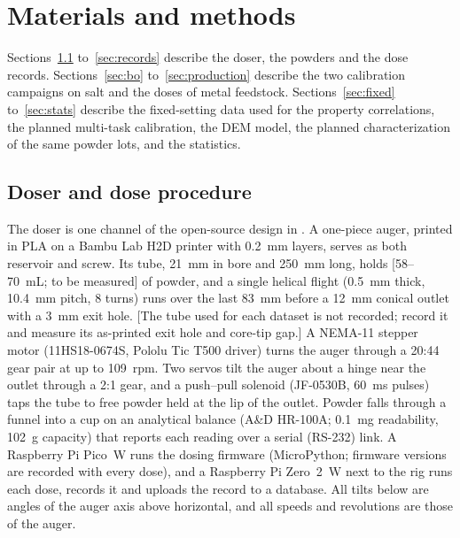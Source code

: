 \documentclass[preprint,12pt]{elsarticle}
\newcommand{\ph}[1]{\textcolor{orange!75!black}{\textsf{[#1]}}}
\begin{document}
\section{Materials and methods}
\label{sec:methods}

Sections~\ref{sec:doser} to~\ref{sec:records} describe the doser, the powders and the dose records. Sections~\ref{sec:bo} to~\ref{sec:production} describe the two calibration campaigns on salt and the doses of metal feedstock. Sections~\ref{sec:fixed} to~\ref{sec:stats} describe the fixed-setting data used for the property correlations, the planned multi-task calibration, the DEM model, the planned characterization of the same powder lots, and the statistics.

\subsection{Doser and dose procedure}
\label{sec:doser}

The doser is one channel of the open-source design in \cite{Charles2026Open,PowderDoserRepo}. A one-piece auger, printed in PLA on a Bambu Lab H2D printer with 0.2~mm layers, serves as both reservoir and screw. Its tube, 21~mm in bore and 250~mm long, holds \ph{58--70~mL; to be measured} of powder, and a single helical flight (0.5~mm thick, 10.4~mm pitch, 8 turns) runs over the last 83~mm before a 12~mm conical outlet with a 3~mm exit hole. \ph{The tube used for each dataset is not recorded; record it and measure its as-printed exit hole and core-tip gap.} A NEMA-11 stepper motor (11HS18-0674S, Pololu Tic T500 driver) turns the auger through a 20:44 gear pair at up to 109~rpm. Two servos tilt the auger about a hinge near the outlet through a 2:1 gear, and a push--pull solenoid (JF-0530B, 60~ms pulses) taps the tube to free powder held at the lip of the outlet. Powder falls through a funnel into a cup on an analytical balance (A\&D HR-100A; 0.1~mg readability, 102~g capacity) that reports each reading over a serial (RS-232) link. A Raspberry Pi Pico~W runs the dosing firmware (MicroPython; firmware versions are recorded with every dose), and a Raspberry Pi Zero~2~W next to the rig runs each dose, records it and uploads the record to a database. All tilts below are angles of the auger axis above horizontal, and all speeds and revolutions are those of the auger.
\end{document}
